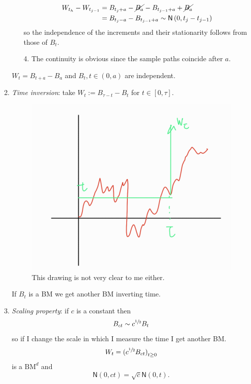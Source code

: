 \documentclass[12pt]{report}
\begin{document}
\begin{enumerate}[\circnum]
\begin{fancyproof}
\begin{enumerate}
			\begin{align*}
				W_{t_{h}}-W_{t_{j-1}}&=B_{t_{j}+a}-\cancel{B_{a}}-B_{t_{j-1}+a}+\cancel{B_{a}}\\
				&=B_{t_{j}-a}-B_{t_{j-1}+a}\sim\mathsf{N}\left(0,t_{j}-t_{j-1}\right)
			\end{align*}
			so the independence of the increments and their stationarity follows from those of $B_{t}$.\hspace*{\fill}\faCheckCircle
			\item[4.] The continuity is obvious since the sample paths coincide after $a$.\hspace*{\fill}\faCheckCircle
		\end{enumerate}
	\end{fancyproof}
	\begin{lemma}
		$W_{t}=B_{t+a}-B_{a}$ and $B_{t},t\in(0,a)$ are independent.
	\end{lemma}
	\item \emph{Time inversion}: take $W_{t}:=B_{\tau-t}-B_{t}$ for $t\in[0,\tau]$.
	\begin{figure}[H]
		\centering
		\includegraphics[width=0.5\linewidth]{img/screenshot013}
		\caption{This drawing is not very clear to me either.}
		\label{fig:screenshot013}
	\end{figure}
	If $B_{t}$ is a BM we get another BM inverting time.
	\item \emph{Scaling property}: if $c$ is a constant then 
	\begin{equation*}
		B_{ct}\sim c^{\sfrac{1}{2}}B_{t}
	\end{equation*}
	so if I change the scale in which I measure the time I get another BM.
	\begin{equation*}
		W_{t}={(c^{\sfrac{1}{2}}B_{ct})}_{t\geq 0}
	\end{equation*}
	is a $\mathrm{BM}^{d}$ and
	\begin{equation*}
		\mathsf{N}(0,ct)=\sqrt{c}\mathsf{N}(0,t).
	\end{equation*}

\end{enumerate}
\end{document}
